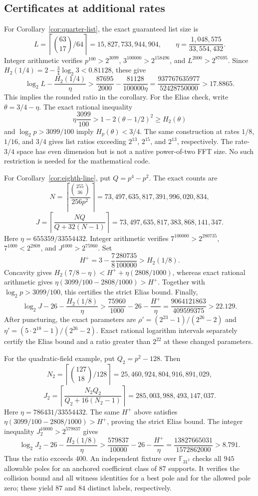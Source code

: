 \documentclass[11pt,letterpaper]{article}
\theoremstyle{definition}
\theoremstyle{remark}
\begin{document}
\subsection{Certificates at additional rates}
\label{app:other-rate-certificates}

For Corollary~\ref{cor:quarter-list}, the exact guaranteed list size is
\[
 L=\left\lceil\binom{63}{17}/64\right\rceil
  =15{,}827{,}733{,}944{,}904,
 \qquad \eta=\frac{1{,}048{,}575}{33{,}554{,}432}.
\]
Integer arithmetic verifies $p^{100}>2^{3099}$,
$3^{100000}>2^{158496}$, and $L^{2000}>2^{87695}$.
Since $H_2(1/4)=2-\frac34\log_2 3<0.81128$, these give
\[
 \log_2L-\frac{H_2(1/4)}{\eta}
 >\frac{87695}{2000}-\frac{81128}{100000\eta}
 =\frac{937767635977}{52428750000}>17.8865.
\]
This implies the rounded ratio in the corollary. For the Elias check,
write $\theta=3/4-\eta$. The exact rational inequality
\[
 \eta\frac{3099}{100}>1-2(\theta-1/2)^2\ge H_2(\theta)
\]
and $\log_2p>3099/100$ imply $H_p(\theta)<3/4$.
The same construction at rates $1/8$, $1/16$, and $3/4$ gives list
ratios exceeding $2^{13}$, $2^{15}$, and $2^{13}$, respectively.
The rate-$3/4$ space has even dimension but is not a native power-of-two
FFT size. No such restriction is needed for the mathematical code.

For Corollary~\ref{cor:eighth-line}, put $Q=p^4-p^2$. The exact counts are
\[
 N=\left\lceil\frac{\binom{255}{36}}{256p^2}\right\rceil
 =73{,}497{,}635{,}817{,}391{,}996{,}020{,}834,
\]
\[
 J=\left\lceil\frac{NQ}{Q+32(N-1)}\right\rceil
 =73{,}497{,}635{,}817{,}383{,}868{,}141{,}347.
\]
Here $\eta=655359/33554432$. Integer arithmetic verifies
$7^{100000}>2^{280735}$, $7^{1000}<2^{2808}$, and
$J^{1000}>2^{75960}$. Set
\[
 H^+=3-\frac78\frac{280735}{100000}>H_2(1/8).
\]
Concavity gives
$H_2(7/8-\eta)<H^++\eta(2808/1000)$, whereas exact rational
arithmetic gives $\eta(3099/100-2808/1000)>H^+$.
Together with $\log_2p>3099/100$, this certifies the strict Elias bound.
Finally,
\[
 \log_2J-26-\frac{H_2(1/8)}\eta
 >\frac{75960}{1000}-26-\frac{H^+}\eta
 =\frac{9064121863}{409599375}>22.129.
\]
After puncturing, the exact parameters are
$\rho'=(2^{23}-1)/(2^{26}-2)$ and
$\eta'=(5\cdot2^{18}-1)/(2^{26}-2)$.
Exact rational logarithm intervals separately certify the Elias bound
and a ratio greater than $2^{22}$ at these changed parameters.

For the quadratic-field example, put $Q_2=p^2-128$. Then
\[
 N_2=\left\lceil\binom{127}{18}/128\right\rceil
 =25{,}460{,}924{,}804{,}916{,}891{,}029,
\]
\[
 J_2=\left\lceil\frac{N_2Q_2}{Q_2+16(N_2-1)}\right\rceil
 =285{,}003{,}988{,}493{,}147{,}037.
\]
Here $\eta=786431/33554432$. The same $H^+$ above satisfies
$\eta(3099/100-2808/1000)>H^+$, proving the strict Elias bound.
The integer inequality $J_2^{10000}>2^{579837}$ gives
\[
 \log_2J_2-26-\frac{H_2(1/8)}\eta
 >\frac{579837}{10000}-26-\frac{H^+}\eta
 =\frac{13827665031}{1572862000}>8.791.
\]
Thus the ratio exceeds $400$. An independent fixture over
$\mathbb F_{31^2}$ checks all $945$ allowable poles for an anchored
coefficient class of $87$ supports. It verifies the collision bound
and all witness identities for a best pole and for the allowed pole
zero; these yield $87$ and $84$ distinct labels, respectively.
\end{document}
